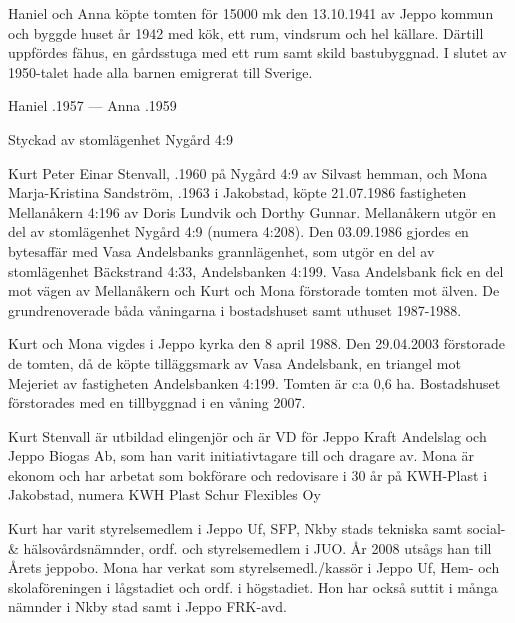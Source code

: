 Haniel och Anna köpte tomten för 15000 mk den 13.10.1941 av Jeppo kommun och byggde huset år 1942 med kök, ett rum, vindsrum och hel källare. Därtill uppfördes fähus, en gårdsstuga med ett rum samt skild bastubyggnad. I slutet av 1950-talet hade alla barnen emigrerat till Sverige.

Haniel .1957  ---  Anna .1959



Styckad av stomlägenhet Nygård 4:9


Kurt Peter Einar Stenvall, .1960 på Nygård 4:9 av Silvast hemman, och Mona Marja-Kristina Sandström, .1963 i 	Jakobstad, köpte 21.07.1986 fastigheten Mellanåkern 4:196 av Doris Lundvik och Dorthy Gunnar. Mellanåkern utgör en del av	stomlägenhet Nygård 4:9 (numera 4:208). Den 03.09.1986 gjordes en bytesaffär med Vasa Andelsbanks grannlägenhet, som utgör en del av stomlägenhet Bäckstrand 4:33, Andelsbanken 4:199. Vasa Andelsbank fick en del mot vägen av Mellanåkern och Kurt och Mona förstorade	tomten mot älven. De grundrenoverade båda våningarna i	bostadshuset samt uthuset 1987-1988.

Kurt och Mona vigdes i Jeppo	kyrka den 8 april 1988. Den 29.04.2003 förstorade de tomten, då de köpte tilläggsmark av Vasa Andelsbank, en triangel mot Mejeriet av fastigheten Andelsbanken 4:199. Tomten är c:a 0,6 ha.	Bostadshuset förstorades med en tillbyggnad i en våning 2007.

Kurt Stenvall är utbildad elingenjör och är VD för Jeppo Kraft Andelslag och Jeppo Biogas Ab, som han varit initiativtagare till och dragare av. Mona är ekonom och har arbetat som bokförare och redovisare i 30 år på	KWH-Plast i Jakobstad, numera KWH Plast Schur Flexibles Oy
\begin{jhchildren}
  \item {}
  \item {}
\end{jhchildren}
Kurt har varit styrelsemedlem i Jeppo Uf, SFP, Nkby stads tekniska samt social- \& hälsovårdsnämnder, ordf. och styrelsemedlem i JUO. År 2008 utsågs han till Årets jeppobo.
Mona har verkat som styrelsemedl./kassör i Jeppo Uf, Hem- och skolaföreningen i lågstadiet och ordf. i högstadiet. Hon har också suttit i många nämnder i Nkby stad samt i Jeppo FRK-avd.

